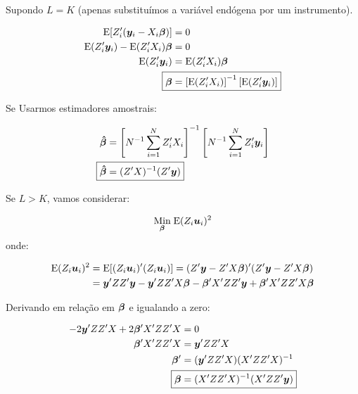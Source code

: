 \documentclass[11pt, oneside, a4paper, article]{article}
\numberwithin{equation}{section}
\begin{document}
Supondo $L = K$ (apenas substituímos a variável endógena por um instrumento).

\vspace{-1 em}
\begin{align*}
\E[ Z_{i}^{\prime} ( \mbs{y}_{i} - X_{i} \mbs{\beta} ) ] &= 0
\\
\E( Z_{i}^{\prime} \mbs{y}_{i} ) - \E( Z_{i}^{\prime} X_{i} ) \mbs{\beta} &= 0
\\
\E( Z_{i}^{\prime} \mbs{y}_{i} ) &= \E( Z_{i}^{\prime} X_{i} ) \mbs{\beta}
\\
\Aboxed{
\mbs{\beta} &=
\left[ \E( Z_{i}^{\prime} X_{i} ) \right]^{-1}
\left[ \E( Z_{i}^{\prime} \mbs{y}_{i} ) \right]
}
\end{align*}

Se Usarmos estimadores amostrais:

\vspace{-1 em}
\begin{align*}
\mbs{\hat{\beta}} &=
\left[ N^{-1} \sum_{i=1}^{N} Z_{i}^{\prime} X_{i} \right]^{-1}
\left[ N^{-1} \sum_{i=1}^{N} Z_{i}^{\prime} \mbs{y}_{i} \right]
\\
\Aboxed{
\mbs{\hat{\beta}} &=
( Z^{\prime} X )^{-1} ( Z^{\prime} \mbs{y} ) }
\end{align*}

\vspace{1 em}
Se $L > K$, vamos considerar:

\vspace{-1 em}
\begin{align*}
\underset{\boldsymbol{\beta}}{\text{Min}} \;
\text{E}( Z_{i}\boldsymbol{u}_{i} )^2
\end{align*}
\noindent onde:

\vspace{-1 em}
\begin{align*}
\text{E}( Z_{i}\boldsymbol{u}_{i} )^2 
&=
\text{E}[ ( Z_{i}\boldsymbol{u}_{i} )' ( Z_{i}\boldsymbol{u}_{i} ) ]
=
( Z' \boldsymbol{y} - Z' X \boldsymbol{\beta} )' ( Z' \boldsymbol{y} - Z' X \boldsymbol{\beta} )
\\
&=
\boldsymbol{y}' ZZ' \boldsymbol{y}
-
\boldsymbol{y}' ZZ' X \boldsymbol{\beta}
-
\boldsymbol{\beta}' X' ZZ' \boldsymbol{y}
+
\boldsymbol{\beta}' X' ZZ' X \boldsymbol{\beta}
\end{align*}

Derivando em relação em $\boldsymbol{\beta}$ e igualando a zero:

\vspace{-1 em}
\begin{align*}
-2 \mbs{y}' ZZ' X + 2 \mbs{\beta}'X' ZZ' X &= 0
\\
\mbs{\beta}'X' ZZ' X &= \mbs{y}' ZZ' X 
\\
\mbs{\beta}' &= ( \mbs{y}' ZZ' X ) ( X' ZZ' X )^{-1}
\\
\Aboxed{
\mbs{\beta} &= ( X' ZZ' X )^{-1} ( X' ZZ' \mbs{y} ) }
\end{align*}
\end{document}

